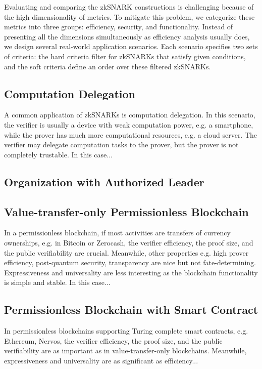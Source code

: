 \documentclass[acmtog]{acmart}
\begin{document}
Evaluating and comparing the zkSNARK constructions is challenging because of the high dimensionality of metrics.
To mitigate this problem, we categorize these metrics into three groups: efficiency, security, and functionality.
Instead of presenting all the dimensions simultaneously as efficiency analysis usually does, we design several real-world application scenarios.
Each scenario specifies two sets of criteria: the hard criteria filter for zkSNARKs that satisfy given conditions, and the soft criteria define an order over these filtered zkSNARKs.

\subsection{Computation Delegation}

A common application of zkSNARKs is computation delegation.
In this scenario, the verifier is usually a device with weak computation power, e.g. a smartphone, while the prover has much more computational resources, e.g. a cloud server.
The verifier may delegate computation tasks to the prover, but the prover is not completely trustable.
In this case...

\subsection{Organization with Authorized Leader}

\subsection{Value-transfer-only Permissionless Blockchain}

In a permissionless blockchain, if most activities are transfers of currency ownerships, e.g. in Bitcoin or Zerocash, the verifier efficiency, the proof size, and the public verifiability are crucial.
Meanwhile, other properties e.g. high prover efficiency, post-quantum security, transparency are nice but not fate-determining.
Expressiveness and universality are less interesting as the blockchain functionality is simple and stable.
In this case...

\subsection{Permissionless Blockchain with Smart Contract}

In permissionless blockchains supporting Turing complete smart contracts, e.g. Ethereum, Nervos, the verifier efficiency, the proof size, and the public verifiability are as important as in value-transfer-only blockchains.
Meanwhile, expressiveness and universality are as significant as efficiency...
\end{document}

